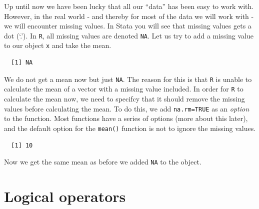 \documentclass[12pt,oneside]{reedthesis}
\theoremstyle{definition}
\theoremstyle{definition}
\theoremstyle{definition}
\theoremstyle{remark}
\begin{document}
  Up until now we have been lucky that all our ``data'' has been easy to
  work with. However, in the real world - and thereby for most of the data
  we will work with - we will encounter missing values. In Stata you will
  see that missing values gets a dot (`.'). In \texttt{R}, all missing
  values are denoted \texttt{NA}. Let us try to add a missing value to our
  object \texttt{x} and take the mean.
  \begin{Shaded}
  \begin{Highlighting}[]
  \StringTok{ }\NormalTok{)}
  
  \end{Highlighting}
  \end{Shaded}
  \begin{verbatim}
  [1] NA
  \end{verbatim}
  We do not get a mean now but just \texttt{NA}. The reason for this is
  that \texttt{R} is unable to calculate the mean of a vector with a
  missing value included. In order for \texttt{R} to calculate the mean
  now, we need to specifcy that it should remove the missing values before
  calculating the mean. To do this, we add \texttt{na.rm=TRUE} as an
  \emph{option} to the function. Most functions have a series of options
  (more about this later), and the default option for the \texttt{mean()}
  function is not to ignore the missing values.
  \begin{Shaded}
  \begin{Highlighting}[]
  \NormalTok{)}
  \end{Highlighting}
  \end{Shaded}
  \begin{verbatim}
  [1] 10
  \end{verbatim}
  Now we get the same mean as before we added \texttt{NA} to the object.
  
  \section{Logical operators}\label{logical-operators}
  
\end{document}
